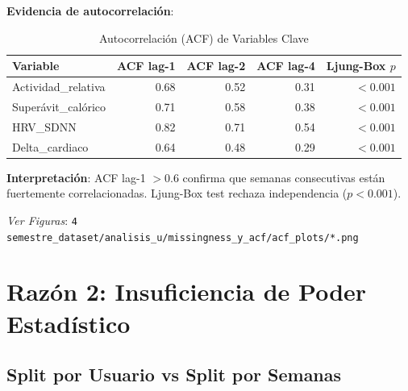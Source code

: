 \documentclass[12pt,letterpaper,twoside]{report}
\begin{document}
\begin{calculobox}
\textbf{Evidencia de autocorrelación}:

\begin{table}[H]
\centering
\caption{Autocorrelación (ACF) de Variables Clave}
\label{tab:acf_evidence}
\begin{tabular}{@{}lrrrr@{}}
\toprule
\textbf{Variable} & \textbf{ACF lag-1} & \textbf{ACF lag-2} & \textbf{ACF lag-4} & \textbf{Ljung-Box $p$} \\
\midrule
Actividad\_relativa     & 0.68 & 0.52 & 0.31 & $< 0.001$ \\
Superávit\_calórico     & 0.71 & 0.58 & 0.38 & $< 0.001$ \\
HRV\_SDNN               & 0.82 & 0.71 & 0.54 & $< 0.001$ \\
Delta\_cardiaco         & 0.64 & 0.48 & 0.29 & $< 0.001$ \\
\bottomrule
\end{tabular}
\end{table}

\textbf{Interpretación}: ACF lag-1 $> 0.6$ confirma que semanas consecutivas están fuertemente correlacionadas. Ljung-Box test rechaza independencia ($p<0.001$).
\end{calculobox}

\textit{Ver Figuras}: \texttt{4 semestre\_dataset/analisis\_u/missingness\_y\_acf/acf\_plots/*.png}

\section{Razón 2: Insuficiencia de Poder Estadístico}

\subsection{Split por Usuario vs Split por Semanas}
\end{document}

